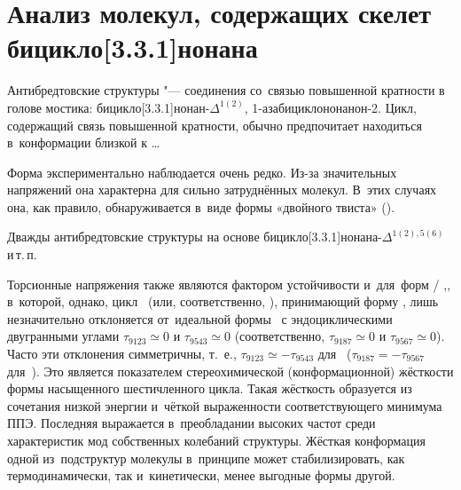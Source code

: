 \section{Анализ молекул, содержащих скелет бицикло[3.3.1]нонана}

Антибредтовские структуры "--- соединения со~связью повышенной кратности в голове мостика: бицикло[3.3.1]нонан-$\Delta^{1(2)}$, 1-азабицикло\-[3.3.1]нонанон-2. Цикл, содержащий связь повышенной кратности, обычно предпочитает находиться в~конформации близкой к \dots

\begin{center}
   \quad
   \quad
\end{center}


Форма \BB{} экспериментально наблюдается очень редко. Из-за значительных напряжений она характерна для сильно затруднённых молекул. В~этих случаях она, как правило, обнаруживается в~виде формы «двойного твиста» (\TT{}).

Дважды антибредтовские структуры на основе бицикло[3.3.1]нонана-$\Delta^{1(2),5(6)}$  и\,т.\,п.

\begin{center}
   \quad
   \quad {}
\end{center}

Торсионные напряжения также являются фактором устойчивости и~для~форм \BC{} / \CB{},, в~которой, однако, цикл~\CycleFirst{} (или, соответственно, \CycleSecond{}), принимающий форму , лишь незначительно отклоняется от~идеальной формы ~с эндоциклическими двугранными углами $\tau_{9123}\simeq 0$ и $\tau_{9543}\simeq 0$ (соответственно, $\tau_{9187}\simeq 0$ и $\tau_{9567}\simeq 0$). Часто эти отклонения симметричны, т.~е., $\tau_{9123} \simeq - \tau_{9543}$ для~\BC{} ($\tau_{9187} = -\tau_{9567}$ для~\CB{}). Это является показателем стереохимической (конформационной) жёсткости формы  насыщенного шестичленного цикла. Такая жёсткость образуется из сочетания низкой энергии и~чёткой выраженности соответствующего минимума ППЭ. Последняя выражается в~преобладании высоких частот среди характеристик мод собственных колебаний структуры. Жёсткая конформация одной из~подструктур молекулы в~принципе может стабилизировать, как термодинамически, так и~кинетически, менее выгодные формы другой.

